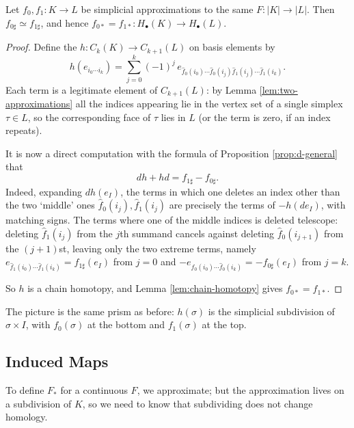 \begin{theorem} \label{thm:approx-chain-homotopic}
	Let $f_0, f_1: K \to L$ be simplicial approximations to the same $F: |K|\to|L|$. Then $f_{0\sharp}\simeq f_{1\sharp}$, and hence $f_{0*} = f_{1*}: H_\bullet(K)\to H_\bullet(L)$.
\end{theorem}
\begin{proof}
	Define the  $h: C_k(K)\to C_{k+1}(L)$ on basis elements by
	$$
	h(e_{i_0\cdots i_k}) = \sum_{j=0}^k (-1)^j\, e_{\hat f_0(i_0)\cdots \hat f_0(i_j)\hat f_1(i_j)\cdots \hat f_1(i_k)} .
	$$
	Each term is a legitimate element of $C_{k+1}(L)$: by Lemma \ref{lem:two-approximations} all the indices appearing lie in the vertex set of a single simplex $\tau\in L$, so the corresponding face of $\tau$ lies in $L$ (or the term is zero, if an index repeats).

	It is now a direct computation with the formula of Proposition \ref{prop:d-general} that
	$$
	dh + hd = f_{1\sharp}-f_{0\sharp}.
	$$
	Indeed, expanding $d h(e_I)$, the terms in which one deletes an index other than the two `middle' ones $\hat f_0(i_j), \hat f_1(i_j)$ are precisely the terms of $-h(d e_I)$, with matching signs. The terms where one of the middle indices is deleted telescope: deleting $\hat f_1(i_j)$ from the $j$th summand cancels against deleting $\hat f_0(i_{j+1})$ from the $(j+1)$st, leaving only the two extreme terms, namely $e_{\hat f_1(i_0)\cdots \hat f_1(i_k)} = f_{1\sharp}(e_I)$ from $j=0$ and $-e_{\hat f_0(i_0)\cdots\hat f_0(i_k)} = -f_{0\sharp}(e_I)$ from $j = k$.

	So $h$ is a chain homotopy, and Lemma \ref{lem:chain-homotopy} gives $f_{0*} = f_{1*}$.
\end{proof}

The picture is the same prism as before: $h(\sigma)$ is the simplicial subdivision of
$\sigma\times I$, with $f_0(\sigma)$ at the bottom and $f_1(\sigma)$ at the top.

\subsection{Induced Maps}

To define $F_*$ for a continuous $F$, we approximate; but the approximation lives on a
subdivision of $K$, so we need to know that subdividing does not change homology.

